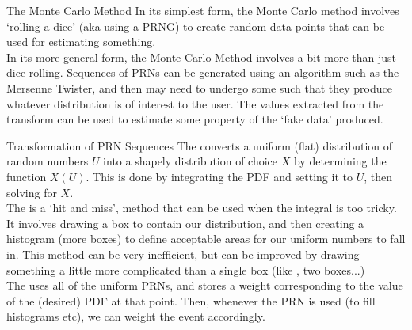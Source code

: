\documentclass[10pt,sans,english,compress,xcolor=dvipsnames]{beamer}
\begin{document}
\begin{frame}{The Monte Carlo Method}
\footnotesize
 In its simplest form, the Monte Carlo method involves `rolling a dice' (aka using a PRNG) to create random data points that can be used for estimating something.\\[1ex]
 
 In its more general form, the Monte Carlo Method involves a bit more than just dice rolling. Sequences of PRNs can be generated using an algorithm such as the Mersenne Twister, and then may need to undergo some  such that they produce whatever distribution is of interest to the user. The values extracted from the transform can be used to estimate some property of the `fake data' produced.\\[1ex]
 
 
 \end{frame} 

\begin{frame}{Transformation of PRN Sequences}
\footnotesize
The  converts a uniform (flat) distribution of random numbers $U$  into a shapely distribution of choice $X$ by determining the function  $X(U)$. This is done by integrating the PDF and setting it to $U$, then solving for $X$.\\[1ex]

The   is a `hit and miss', method that can be used when the integral is too tricky. It involves drawing a box to contain our distribution, and then creating a histogram (more boxes) to define acceptable areas for our uniform numbers to fall in. This method can be very inefficient, but can be improved by drawing something a little more complicated than a single box (like , two boxes...)\\[1ex]

The  uses all of the uniform PRNs, and stores a weight corresponding to the value of the (desired) PDF at that point. Then, whenever the PRN is used (to fill histograms etc), we can weight the event accordingly. \\[1ex]

\end{frame} 
\end{document}
